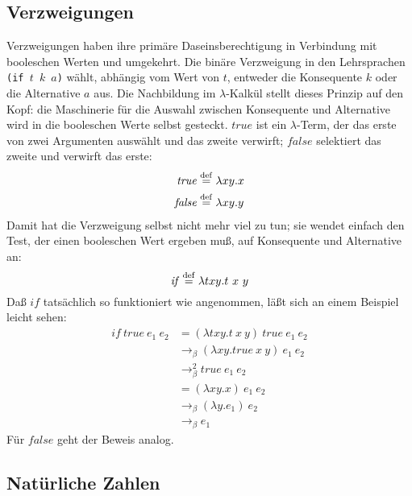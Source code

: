 \subsection{Verzweigungen}
\label{sec:booleans}
%
Verzweigungen haben ihre primäre Daseinsberechtigung in Verbindung mit
booleschen Werten und umgekehrt.
Die binäre Verzweigung in den Lehrsprachen
\texttt{(if \(t\) \(k\) \(a\))}
wählt, abhängig vom Wert von $t$,
entweder die Konsequente $k$ oder die Alternative $a$ aus.  Die Nachbildung im
$\lambda$-Kalkül stellt dieses Prinzip auf den Kopf: die Maschinerie
für die Auswahl zwischen Konsequente und Alternative wird in die
booleschen Werte selbst gesteckt.  $\mathit{true}$ ist ein
$\lambda$-Term, der das erste von zwei Argumenten auswählt und das
zweite verwirft; $\mathit{false}$ selektiert das zweite und verwirft
das erste:
%
\begin{align*}
  \mathit{true} & \stackrel{\rm def}{=}{} \lambda x y.x \\
  \mathit{false} & \stackrel{\rm def}{=}{} \lambda x y.y
\end{align*}
%
Damit hat die Verzweigung selbst nicht mehr viel zu tun; sie wendet
einfach den Test, der einen booleschen Wert ergeben muß, auf
Konsequente und Alternative an:
%
\begin{displaymath}
  \mathit{if} \stackrel{\rm def}{=}{} \lambda t x y.t~x~y
\end{displaymath}
%
Daß $\mathit{if}$ tatsächlich so funktioniert wie angenommen, läßt
sich an einem Beispiel leicht sehen:
%
\begin{displaymath}
  \begin{split}
    \mathit{if}~\mathit{true}~e_1~e_2 & =
    (\lambda t x y.t~x~y)~\mathit{true}~e_1~e_2
    \\
    & \rightarrow_\beta (\lambda x y.\mathit{true}~x~y)~e_1~e_2\\
    & \rightarrow_\beta^2 \mathit{true}~e_1~e_2\\
    & = (\lambda x y.x)~e_1~e_2\\
    & \rightarrow_\beta (\lambda y.e_1)~e_2\\
    & \rightarrow_\beta e_1  \end{split}
\end{displaymath}
%
Für $\mathit{false}$ geht der Beweis analog.

\subsection{Natürliche Zahlen}

